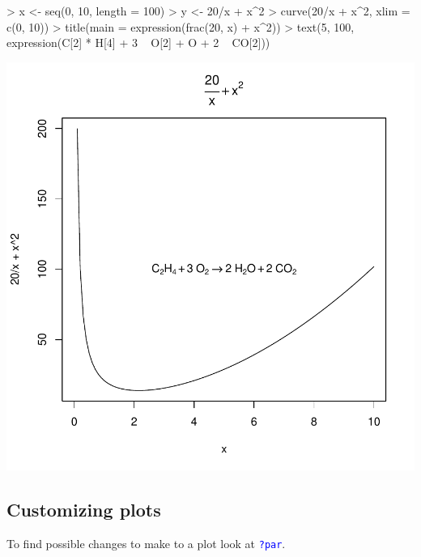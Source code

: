 \documentclass{scrartcl}
\newcommand{\Rcode}[1]{\texttt{\textcolor{blue}{#1}}}
\begin{document}
\begin{Schunk}
\begin{Sinput}
> x <- seq(0, 10, length = 100)
> y <- 20/x + x^2
> curve(20/x + x^2, xlim = c(0, 10))
> title(main = expression(frac(20, x) + x^2))
> text(5, 100, expression(C[2] * H[4] + 3 ~ O[2] %
+     O + 2 ~ CO[2]))
\end{Sinput}
\end{Schunk}
\includegraphics{figures/f-math1}

\subsection{Customizing plots}

To find possible changes to make to a plot look at \Rcode{?par}. 
\end{document}
